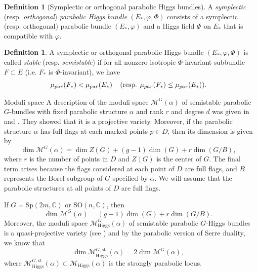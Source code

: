 \documentclass[11pt, reqno]{amsart}
\makeatletter
\numberwithin{equation}{section}
\def\subsubsection{\@startsection{subsubsection}{3}%
  \normalparindent\z@{-.5em}%
  {\normalfont\itshape}}
\theoremstyle{definition}
\newtheorem{definition}[theorem]{Definition}
\makeatother
\begin{document}
\begin{definition}[Symplectic or orthogonal parabolic Higgs bundles]
A \textit{symplectic} (resp. \textit{orthogonal}) \textit{parabolic Higgs bundle} $(E_*,\varphi,\Phi)$ consists of a symplectic (resp. orthogonal) parabolic bundle $(E_*,\varphi)$ and a Higgs field $\Phi$ on $E_*$ that is compatible with $\varphi$.
\end{definition}



\begin{definition}
	A symplectic or orthogonal parabolic Higgs bundle $(E_*,\varphi,\Phi)$ is called \textit{stable} (resp. \textit{semistable}) if for all nonzero isotropic $\Phi$-invariant subbundle $F \subset E$ (i.e. $F_*$ is $\Phi$-invariant), we have
	\[
	\mu_{par}(F_*) < \mu_{par}(E_*) \hspace{0.4cm}(\text{resp.} \hspace{0.15cm} \mu_{par}(F_*) \leq \mu_{par}(E_*)).
	\]
\end{definition}

\subsubsection{Moduli space}
A description of the moduli space $\mathcal{M}^G(\alpha)$ of semistable parabolic $G$-bundles with fixed parabolic structure $\alpha$ and rank $r$ and degree $d$ was given in \cite{BBN01} and \cite{BR89}. They showed that it is a projective variety. Moreover, if the parabolic structure $\alpha$ has full flags at each marked points $p\in D$, then its dimension is given by
\[
\dim\mathcal{M}^G(\alpha)= \dim Z(G) +  (g-1)\dim(G) + r\dim(G/B),
\]
where $r$ is the number of points in $D$ and $Z(G)$ is the center of $G$. The final term arises because the flags considered at each point of $D$ are full flags, and $B$ represents the Borel subgroup of $G$ specified by $\alpha$. We will assume that the parabolic structures at all points of $D$ are full flags.

If $G=\mathrm{Sp}(2m,\mathbb{C})$ or $\mathrm{SO}(n,\mathbb{C})$, then
\[
\dim\mathcal{M}^G(\alpha) = (g-1)\dim(G) + r\dim(G/B).
\]
Moreover, the moduli space $\mathcal{M}^G_{\mathrm{Higgs}}(\alpha)$ of semistable parabolic $G$-Higgs bundles is a quasi-projective variety (see \cite{Y93}) and by the parabolic version of Serre duality, we know that
\[
\dim \mathcal{M}^{G,\mathrm{st}}_{\mathrm{Higgs}}(\alpha) = 2\dim \mathcal{M}^G(\alpha),
\]
where $\mathcal{M}^{G,\mathrm{st}}_{\mathrm{Higgs}}(\alpha) \subset \mathcal{M}_{\mathrm{Higgs}}(\alpha)$ is the strongly parabolic locus. 
\end{document}

